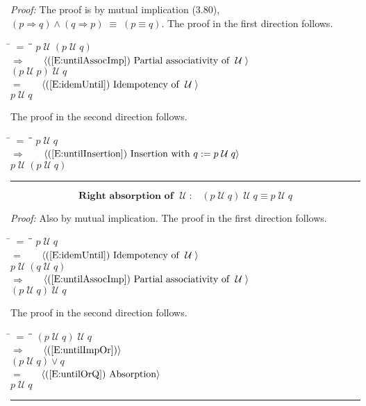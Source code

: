 \documentclass[fleqn, leqno]{article}
\newcommand{\lgap}{2pt}                             %
\newcommand{\mymathindent}{24pt}                    %
\newcommand{\equivs}{\ensuremath{\;\equiv\;}}       %
\newcommand{\impl}{\ensuremath{\Rightarrow}}        %
\newcommand{\Until}{\;\mathcal{U}\;}
\newcommand{\myqed}{\rule[-.23ex]{1.2ex}{2.0ex}}
\newcommand{\myqedtab}{\hspace{388.5pt}}              %
\newcommand{\Gll} {\langle}                         %
\newcommand{\Ggg} {\rangle}                         %
\newcommand{\Hint}[1]     {\ \ \ $\Gll              \mbox{#1} \Ggg$ }   %
\begin{document}
\emph{Proof:} The proof is by mutual implication (3.80), $(p\impl q) \land (q\impl p) \equivs (p\equiv q)$.
The proof in the first direction follows.
\begin{tabbing}
\hspace{\mymathindent} \= $= \;$ \= \myqedtab \= \kill
  \> \>   $p \Until (p \Until q)$\\[\lgap]
  \> $\impl$  \>  \Hint{(\ref{E:untilAssocImp}) Partial associativity of $\Until$}\\[\lgap]
  \> \>   $(p \Until p) \Until q$\\[\lgap]
  \> $=$  \>  \Hint{(\ref{E:idemUntil}) Idempotency of $\Until$}\\[\lgap]
  \> \>   $p \Until q$
\end{tabbing}

The proof in the second direction follows.

\begin{tabbing}
\hspace{\mymathindent} \= $= \;$ \= \myqedtab \= \kill
  \> \>   $p \Until q$\\[\lgap]
  \> $\impl$  \>  \Hint{(\ref{E:untilInsertion}) Insertion with $q := p \Until q$}\\[\lgap]
  \> \>   $p \Until (p \Until q)$ \> \myqed
\end{tabbing}

\begin{equation}\label{E:untilIdemR}
\textbf{Right absorption of $\Until$:}\quad (p \Until q) \Until q \equiv p \Until q
\end{equation}

\emph{Proof:} Also by mutual implication.
The proof in the first direction follows.
\begin{tabbing}
\hspace{\mymathindent} \= $= \;$ \= \myqedtab \= \kill
  \> \>   $p \Until q$\\[\lgap]
  \> $=$  \>  \Hint{(\ref{E:idemUntil}) Idempotency of $\Until$}\\[\lgap]
  \> \>   $p \Until (q \Until q)$\\[\lgap]
  \> $\impl$  \>  \Hint{(\ref{E:untilAssocImp}) Partial associativity of $\Until$}\\[\lgap]
  \> \>   $(p \Until q) \Until q$
\end{tabbing}

The proof in the second direction follows.
\begin{tabbing}
\hspace{\mymathindent} \= $= \;$ \= \myqedtab \= \kill
  \> \>   $(p \Until q) \Until q$\\[\lgap]
  \> $\impl$  \>  \Hint{(\ref{E:untilImpOr})}\\[\lgap]
  \> \>   $(p \Until q) \lor q$\\[\lgap]
  \> $=$  \>  \Hint{(\ref{E:untilOrQ}) Absorption}\\[\lgap]
  \> \>   $p \Until q$ \> \myqed
\end{tabbing}
\end{document}
